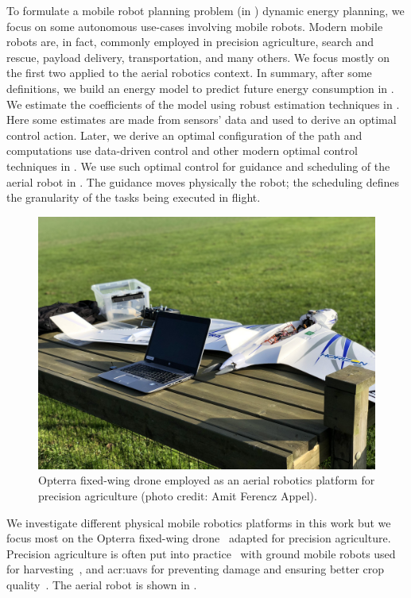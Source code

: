 To formulate a mobile robot planning problem (in ) dynamic energy planning, we focus on some autonomous use-cases involving mobile robots. Modern mobile robots are, in fact, commonly employed in precision agriculture, search and rescue, payload delivery, transportation, and many others. We focus mostly on the first two applied to the aerial robotics context. In summary, after some definitions, we build an energy model to predict future energy consumption in . We estimate the coefficients of the model using robust estimation techniques in . Here some estimates are made from sensors' data and used to derive an optimal control action. Later, we derive an optimal configuration of the path and computations use data-driven control and other modern optimal control techniques in . We use such optimal control for guidance and scheduling of the aerial robot in . The guidance moves physically the robot; the scheduling defines the granularity of the tasks being executed in flight.

\begin{figure}[t]
  \centering
  \includegraphics[width=.7\textwidth]{pictures/photo}
  \caption[Opterra fixed-wing drone]{Opterra fixed-wing drone employed as an aerial robotics platform for precision agriculture {\scriptsize(photo credit: Amit Ferencz Appel)}.}   
  \label{fig:opterra}
\end{figure}

We investigate different physical mobile robotics platforms in this work but we focus most on the Opterra fixed-wing drone~\citep{opterra} adapted for precision agriculture. Precision agriculture is often put into practice~\citep{hajjaj2014review} with ground mobile robots used for harvesting~\citep{qingchun2012study,dong2011development, de2011design, aljanobi2010setup, li2008analysis, edan2000robotic}, and \Gls{acr:uav}s for preventing damage and ensuring better crop quality~\citep{puri2017agriculture, daponte2019review}. The aerial robot is shown in .

